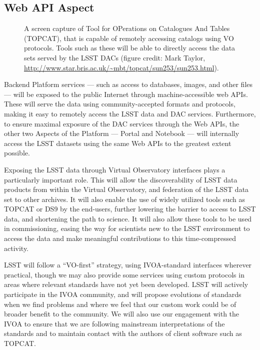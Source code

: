 
\subsection{Web API Aspect\label{sec:apis}}

\begin{figure}
	\centering
	\caption{A screen capture of Tool for OPerations on Catalogues And Tables (TOPCAT), that is capable of remotely accessing catalogs using VO protocols. Tools such as these will be able to directly access the data sets served by the LSST DACs (figure credit: Mark Taylor, \url{http://www.star.bris.ac.uk/~mbt/topcat/sun253/sun253.html}).
		\label{fig:toolsTOPCAT}}
\end{figure}

Backend Platform services --- such as access to
databases, images, and other files --- will be exposed to the public Internet through
machine-accessible web APIs.
These will serve the data using community-accepted
formats and protocols, making it easy to remotely access the LSST data and DAC
services.
Furthermore, to ensure maximal exposure of the DAC services through the Web APIs,
the other two Aspects of the Platform --- Portal and Notebook --- will
internally access the LSST datasets using the same Web APIs to the greatest extent possible.

Exposing the LSST data through Virtual Observatory interfaces plays a particularly important role.
This will allow the discoverability of LSST data products from within the Virtual Observatory,
and federation of the LSST data set to other archives.
It will also enable the use of widely utilized tools such as TOPCAT or DS9 by the end-users,
further lowering the barrier to access to LSST data, and shortening the path to science.
It will also allow these tools to be used in commissioning,
easing the way for scientists new to the LSST environment to access the data and make meaningful
contributions to this time-compressed activity.

LSST will follow a ``VO-first'' strategy, using IVOA-standard interfaces wherever practical,
though we may also provide some services using custom protocols in areas where relevant standards have not yet been developed.
LSST will actively participate in the IVOA community, and will propose evolutions of standards when we find problems and where we feel that our custom work could be of broader benefit to the community.
We will also use our engagement with the IVOA to ensure that we are following mainstream interpretations of the standards and to maintain contact with the authors of client software such as TOPCAT.

